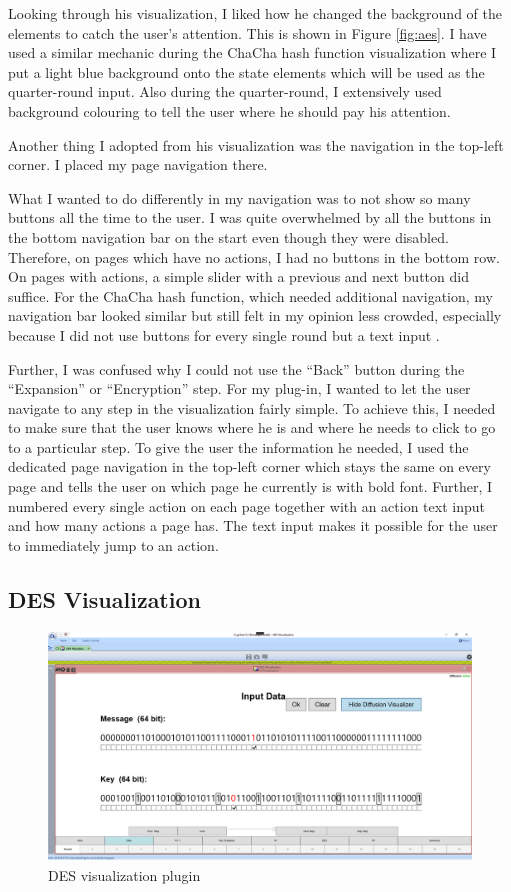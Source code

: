Looking through his visualization, I liked how he changed the background of the elements to catch the user's attention. This is shown in Figure \ref{fig:aes}. I have used a similar mechanic during the ChaCha hash function visualization where I put a light blue background onto the state elements which will be used as the quarter-round input. Also during the quarter-round, I extensively used background colouring to tell the user where he should pay his attention.

Another thing I adopted from his visualization was the navigation in the top-left corner. I placed my page navigation there.

What I wanted to do differently in my navigation was to not show so many buttons all the time to the user. I was quite overwhelmed by all the buttons in the bottom navigation bar on the start even though they were disabled. Therefore, on pages which have no actions, I had no buttons in the bottom row. On pages with actions, a simple slider with a previous and next button did suffice. For the ChaCha hash function, which needed additional navigation, my navigation bar looked similar but still felt in my opinion less crowded, especially because I did not use buttons for every single round but a text input .

Further, I was confused why I could not use the ``Back'' button during the ``Expansion'' or ``Encryption'' step. For my plug-in, I wanted to let the user navigate to any step in the visualization fairly simple. To achieve this, I needed to make sure that the user knows where he is and where he needs to click to go to a particular step. To give the user the information he needed, I used the dedicated page navigation in the top-left corner which stays the same on every page and tells the user on which page he currently is with bold font. Further, I numbered every single action on each page together with an action text input and how many actions a page has. The text input makes it possible for the user to immediately jump to an action.

\subsection{DES Visualization}
\label{sec:desVisualization}

\begin{figure}
\centering
\includegraphics[width=\textwidth]{figures/ct2/des.png}
\caption{DES visualization plugin}
\label{fig:des}
\end{figure}

